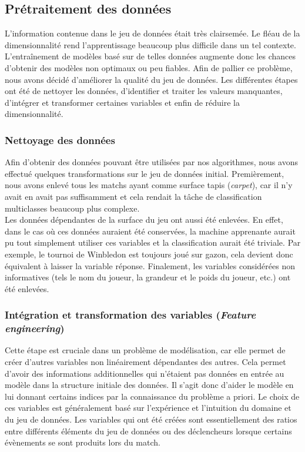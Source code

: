\subsection{Prétraitement des données}
L'information contenue dans le jeu de données était très clairsemée. Le fléau de la dimensionnalité rend l'apprentissage beaucoup plus difficile dans un tel contexte. L'entraînement de modèles basé sur de telles données augmente donc les chances d'obtenir des modèles non optimaux ou peu fiables. Afin de pallier ce problème, nous avons décidé d'améliorer la qualité du jeu de données. Les différentes étapes ont été de nettoyer les données, d'identifier et traiter les valeurs manquantes, d'intégrer et transformer certaines variables et enfin de réduire la dimensionnalité.

\subsubsection{Nettoyage des données}
Afin d'obtenir des données pouvant être utilisées par nos algorithmes, nous avons effectué quelques transformations sur le jeu de données initial. Premièrement, nous avons enlevé tous les matchs ayant comme surface tapis (\textit{carpet}), car il n'y avait en avait pas suffisamment et cela rendait la tâche de classification multiclasses beaucoup plus complexe. \\

Les données dépendantes de la surface du jeu ont aussi été enlevées. En effet, dans le cas où ces données auraient été conservées, la machine apprenante aurait pu tout simplement utiliser ces variables et la classification aurait été triviale. Par exemple, le tournoi de Winbledon est toujours joué sur gazon, cela devient donc équivalent à laisser la variable réponse. Finalement, les variables considérées non informatives (tels le nom du joueur, la grandeur et le poids du joueur, etc.) ont été enlevées.

\subsubsection{Intégration et transformation des variables (\textit{Feature engineering})}
Cette étape est cruciale dans un problème de modélisation, car elle permet de créer d'autres variables non linéairement dépendantes des autres. Cela permet d'avoir des informations additionnelles qui n'étaient pas données en entrée au modèle dans la structure initiale des données. Il s'agit donc d'aider le modèle en lui donnant certains indices par la connaissance du problème a priori. Le choix de ces variables est généralement basé sur l'expérience et l'intuition du domaine et du jeu de données. Les variables qui ont été créées sont essentiellement des ratios entre différents éléments du jeu de données ou des déclencheurs lorsque certains évènements se sont produits lors du match.\\

